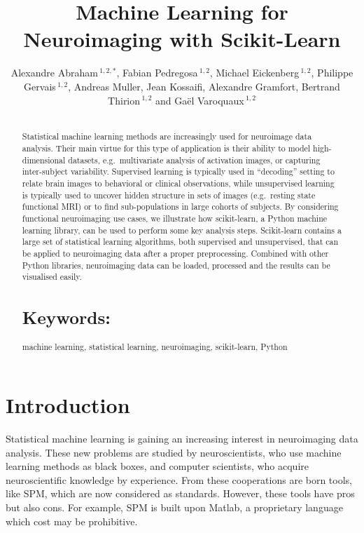 \documentclass{frontiersSCNS} %
\def\firstAuthorLast{Alexandre Abraham {et~al}} %
\def\Authors{
    Alexandre Abraham\,$^{1,2,*}$,
    Fabian Pedregosa\,$^{1,2}$,
    Michael Eickenberg\,$^{1,2}$,
    Philippe Gervais\,$^{1,2}$,
    Andreas Muller,
    Jean Kossaifi,
    Alexandre Gramfort,
    Bertrand Thirion\,$^{1,2}$
    and Ga\"el Varoquaux\,$^{1,2}$}
\newcounter{x}
\newcounter{y}
\begin{document}
\onecolumn
{}

\title[Machine Learning for Neuroimaging with Scikit-Learn]{Machine Learning for Neuroimaging with Scikit-Learn}
\author[\firstAuthorLast ]{\Authors}
\address{}
\correspondance{}
\editor{}

\maketitle
\begin{abstract}

\section{}
Statistical machine learning methods are increasingly used for
neuroimage data analysis. Their main virtue for this type of application
is their ability to model high-dimensional datasets, e.g.\ multivariate
analysis of activation images, or capturing inter-subject variability.
Supervised learning is typically used in “decoding” setting to relate
brain images to behavioral or clinical observations, while
unsupervised learning is typically used to uncover hidden structure in
sets of images (e.g.\ resting state functional MRI) or to find
sub-populations in large cohorts of subjects. By considering
functional neuroimaging use cases, we illustrate how scikit-learn,
a Python machine learning library, can be used to perform some key
analysis steps. Scikit-learn contains a large set of statistical
learning algorithms, both supervised and unsupervised, that can be applied
to neuroimaging data after a proper preprocessing. Combined with other
Python libraries, neuroimaging data can be loaded, processed and the results
can be visualised easily.



\tiny
\section{Keywords:} machine learning, statistical learning, neuroimaging,
scikit-learn, Python
\end{abstract}


\section{Introduction}

Statistical machine learning is gaining an increasing interest in
neuroimaging data analysis. These new problems are studied by
neuroscientists, who use machine learning methods as black boxes, and computer scientists,
who acquire neuroscientific knowledge by experience. From these cooperations are
born tools, like SPM, which are now considered as standards. However,
these tools have pros but also cons. For example, SPM is built upon Matlab, a
proprietary language which cost may be prohibitive.
\end{document}
